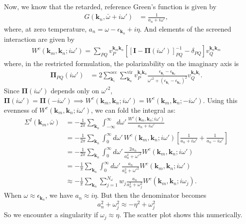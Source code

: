 Now, we know that the retarded, reference Green's function is given by 
\begin{align}
    G\left(\mathbf{k}_n,\bar{\omega}+i\omega'\right)
&= \frac{1}{a_n+i\omega'},
\end{align}
where, at zero temperature, $a_n = \omega - \epsilon_{\mathbf{k}_n} + i\eta$. And elements of the screened interaction are given by
\begin{align}
    W^c\left(\mathbf{k}_m,\mathbf{k}_n;i\omega'\right) = \sum_{PQ} v_P^{\mathbf{k}_m \mathbf{k}_n} \left[ \left[ \mathbf{I} - \boldsymbol{\Pi}(i\omega') \right]^{-1}_{PQ} - \delta_{PQ} \right] v_Q^{\mathbf{k}_n\mathbf{k}_m} 
\end{align}
where, in the restricted formulation, the polarizability on the imaginary axis is
\begin{align}
\boldsymbol{\Pi}_{PQ}\left(i\omega'\right)
&=
2
\sum_{\mathbf{k}_i}^{\mathrm{occ}}
\sum_{\mathbf{k}_a}^{\mathrm{vir}}
v_P^{\mathbf{k}_i\mathbf{k}_a}
\frac{
\epsilon_{\mathbf{k}_i}
-
\epsilon_{\mathbf{k}_a}
}{
\omega'^2
+
\left(
\epsilon_{\mathbf{k}_i}
-
\epsilon_{\mathbf{k}_a}
\right)^2
}
v_Q^{\mathbf{k}_a\mathbf{k}_i}.
\end{align}
Since \(\boldsymbol{\Pi}(i\omega')\) depends only on \(\omega'^2\), $\boldsymbol{\Pi}\left(i\omega'\right)=\boldsymbol{\Pi}\left(-i\omega'\right) \implies W^c\left(\mathbf{k}_m,\mathbf{k}_n;i\omega'\right) = W^c\left(\mathbf{k}_m,\mathbf{k}_n;-i\omega'\right)$.
Using this evenness of $W^c\left(\mathbf{k}_m,\mathbf{k}_n;i\omega'\right)$, we can fold the integral as:
\begin{align}
\Sigma^I\left(\mathbf{k}_m,\bar{\omega}\right)
&=
-\frac{1}{2\pi} \sum_{\mathbf{k}_n}\int_{-\infty}^{\infty} d\omega'\,\frac{W^c\left(\mathbf{k}_m,\mathbf{k}_n;i\omega'\right)}{a_n+i\omega'}
 \\
&=
-\frac{1}{2\pi} \sum_{\mathbf{k}_n}
\int_0^\infty
d\omega'\,
W^c\left(\mathbf{k}_m,\mathbf{k}_n;i\omega'\right)
\left[
\frac{1}{a_n+i\omega'}
+
\frac{1}{a_n-i\omega'}
\right]\\
&=
-\frac{1}{2\pi}
\sum_{\mathbf{k}_n}
\int_0^\infty
d\omega'\,
\frac{2a_n}{a_n^2+\omega'^2}
W^c\left(\mathbf{k}_m,\mathbf{k}_n;i\omega'\right)\\
&=
-\frac{1}{\pi}
\sum_{\mathbf{k}_n}
\int_0^\infty
d\omega'\,
\frac{a_n}{a_n^2+\omega'^2}
W^c\left(\mathbf{k}_m,\mathbf{k}_n;i\omega'\right) \label{eq:fold}\\
&\approx
-\frac{1}{\pi} \sum_{\mathbf{k}_n}
\sum_{j=1}^{N_\omega}
w_j \frac{a_n}{a_n^2+\omega_j^2}
W^c\left(\mathbf{k}_m,\mathbf{k}_n;i\omega_j\right).
\end{align}
When $\omega \approx \epsilon_{\mathbf{k}_n}$, we have \(a_n \approx i \eta\). But then the denominator becomes 
\begin{equation}
    a_n^2 + \omega_j^2 \approx -\eta^2 + \omega_j^2
\end{equation}
So we encounter a singularity if \(\omega_j \approx \eta\). The scatter plot shows this numerically.
